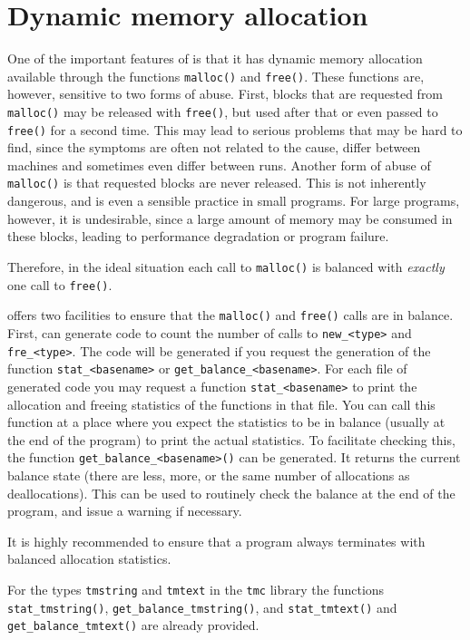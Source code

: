 \section{Dynamic memory allocation}
\label{s.allocation}
One of the important features of {\C} is that it has dynamic memory allocation
available through the functions \verb+malloc()+ and \verb+free()+.
These functions are, however, sensitive to two forms of abuse.
First,
blocks that are requested from \verb+malloc()+
may be released with \verb+free()+, but used after that or even passed to
\verb+free()+ for a second time.
This may lead to serious problems that may be hard to find,
since the symptoms are often not related to the cause, differ between machines
and sometimes even differ between runs.
Another form of abuse of \verb+malloc()+ is that requested blocks are
never released.
This is not inherently dangerous,
and is even a sensible practice in small programs.
For large programs, however, it is undesirable,
since a large amount of memory may be consumed in these blocks,
leading to performance degradation or program failure.
\par
Therefore,
in the ideal situation each call to \verb+malloc()+ is balanced with
\emph{exactly} one call to \verb+free()+.
\par
{\Tm} offers two facilities to ensure that the \verb+malloc()+
and \verb+free()+ calls are in balance.
First,
{\Tm} can generate code to count the number of calls to \verb+new_<type>+
and \verb+fre_<type>+.
The code will be generated if you request the generation of the
function \verb'stat_<basename>' or \verb'get_balance_<basename>'.
For each file of generated {\C} code you may request a function
\verb+stat_<basename>+ to print the allocation and freeing statistics of the
functions in that file.
You can call this function at a place where you expect the statistics
to be in balance (usually at the end of the program) to 
print the actual statistics.
To facilitate checking this, the function \verb+get_balance_<basename>()+
can be generated. It returns the current balance state (there are less, more,
or the same number of allocations as deallocations).
This can be used to routinely check the balance at the end of the program,
and issue a warning if necessary.
\par
It is highly recommended to ensure that a program always terminates
with balanced allocation statistics.
\par
\begin{sloppypar}
For the types \verb'tmstring' and \verb'tmtext' in the \verb'tmc' library
the functions \verb+stat_tmstring()+, \verb+get_balance_tmstring()+,
and \verb+stat_tmtext()+ and \verb+get_balance_tmtext()+ are already provided.
\end{sloppypar}
